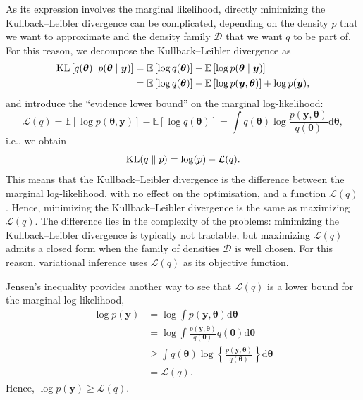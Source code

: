 \documentclass[a4paper, 11pt]{report}
\numberwithin{equation}{chapter}
\DeclareMathOperator*{\KL}{{\rm KL}}
\begin{document}
As its expression involves the marginal likelihood, directly minimizing the Kullback--Leibler divergence can be complicated, depending on the density $p$ that we want to approximate and the density family $\mathcal{D}$ that we want $q$ to be part of. For this reason, we decompose the Kullback--Leibler divergence as
\begin{align*}
\KL\left[q(\boldsymbol{\theta})||p(\boldsymbol{\theta}\mid \boldsymbol{y})\right] &= \mathbb{E}\left[\log q(\boldsymbol{\theta})\right] - \mathbb{E}\left[\log p(\boldsymbol{\theta}\mid \boldsymbol{y})\right]\\
&= \mathbb{E}\left[\log q(\boldsymbol{\theta})\right] - \mathbb{E}\left[\log p(\boldsymbol{y},\boldsymbol{\theta})\right] + \log p(\boldsymbol{y}),
\end{align*}
and introduce the ``evidence lower bound'' on the marginal log-likelihood:
\begin{equation*}
\mathcal{L}(q) = \mathbb{E}\left[\log p(\boldsymbol{\theta},\boldsymbol{y})\right] - \mathbb{E}\left[\log q(\boldsymbol{\theta})\right] =\int q(\boldsymbol{\theta})\log\frac{p(\boldsymbol{y},\boldsymbol{\theta})}{q(\boldsymbol{\theta})}\mathrm{d}\boldsymbol{\theta},
\end{equation*}
i.e., we obtain
\begin{equation*}
\KL(q\parallel p) = \log(p) - \mathcal{L}(q).
\end{equation*}
This means that the Kullback--Leibler divergence is the difference between the marginal log-likelihood, with no effect on the optimisation, and a function $\mathcal{L}(q)$. Hence, minimizing the Kullback--Leibler divergence is the same as maximizing $\mathcal{L}(q)$. The difference lies in the complexity of the problems: minimizing the Kullback--Leibler divergence is typically not tractable, but maximizing $\mathcal{L}(q)$ admits a closed form when the family of densities $\mathcal{D}$ is well chosen. For this reason, variational inference uses $\mathcal{L}(q)$ as its objective function.

Jensen's inequality provides another way to see that $\mathcal{L}(q)$ is a lower bound for the marginal log-likelihood,
\begin{align*}
\log p(\boldsymbol{y}) &= \log \int p(\boldsymbol{y}, \boldsymbol{\theta}) \mathrm{d}\boldsymbol{\theta}\\
&= \log \int \frac{p(\boldsymbol{y}, \boldsymbol{\theta})}{q(\boldsymbol{\theta})}q(\boldsymbol{\theta})\mathrm{d}\boldsymbol{\theta}
\\
&\geq \int q(\boldsymbol{\theta}) \log \left\lbrace \frac{p(\boldsymbol{y}, \boldsymbol{\theta})}{q(\boldsymbol{\theta})} \right\rbrace \mathrm{d}\boldsymbol{\theta}\\
&= \mathcal{L}(q).
\end{align*}
Hence, $\log p(\boldsymbol{y}) \geq \mathcal{L}(q)$.
\end{document}
